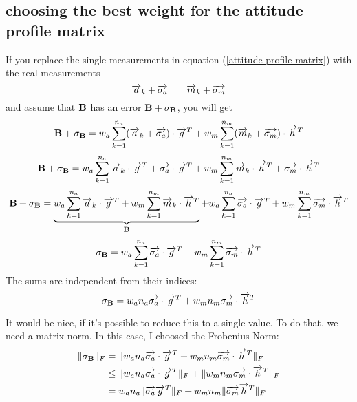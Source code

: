 \subsection{choosing the best weight for the attitude profile matrix}
If you replace the single measurements in equation (\ref{attitude profile matrix}) with the real measurements
\begin{equation}
\overrightarrow{a}_k + \overrightarrow{\sigma_a} \quad \quad \overrightarrow{m}_k + \overrightarrow{\sigma_m}
\end{equation}
and assume that $\mathbf{B}$ has an error $\mathbf{B} +\mathbf{\sigma_B} $, you will get
\begin{equation}
\mathbf{B} +\mathbf{\sigma_B} = w_a \sum_{k=1}^{n_a} (\overrightarrow{a}_k + \overrightarrow{\sigma_a}) \cdot \overrightarrow{g}^{T}  +  w_m \sum_{k=1}^{n_m} (\overrightarrow{m}_k + \overrightarrow{\sigma_m}) \cdot \overrightarrow{h}^{T}
\end{equation}
\begin{equation}
\mathbf{B} +\mathbf{\sigma_B} = w_a \sum_{k=1}^{n_a} \overrightarrow{a}_k \cdot \overrightarrow{g}^{T} + \overrightarrow{\sigma_a} \cdot \overrightarrow{g}^{T} + w_m \sum_{k=1}^{n_m} \overrightarrow{m}_k \cdot \overrightarrow{h}^{T} + \overrightarrow{\sigma_m} \cdot \overrightarrow{h}^{T}
\end{equation}
\begin{equation}
\mathbf{B} +\mathbf{\sigma_B} = \underbrace{w_a \sum_{k=1}^{n_a} \overrightarrow{a}_k \cdot \overrightarrow{g}^{T} + w_m \sum_{k=1}^{n_m} \overrightarrow{m}_k \cdot \overrightarrow{h}^{T}}_{\mathbf{B}} + w_a \sum_{k=1}^{n_a} \overrightarrow{\sigma_a} \cdot \overrightarrow{g}^{T} + w_m \sum_{k=1}^{n_m} \overrightarrow{\sigma_m} \cdot \overrightarrow{h}^{T}
\end{equation}
\begin{equation}
\mathbf{\sigma_B} = w_a \sum_{k=1}^{n_a} \overrightarrow{\sigma_a} \cdot \overrightarrow{g}^{T} + w_m \sum_{k=1}^{n_m} \overrightarrow{\sigma_m} \cdot \overrightarrow{h}^{T}
\end{equation}
The sums are independent from their indices:
\begin{equation}
\mathbf{\sigma_B} = w_a n_a \overrightarrow{\sigma_a} \cdot \overrightarrow{g}^{T} + w_m n_m \overrightarrow{\sigma_m} \cdot \overrightarrow{h}^{T}
\end{equation}

It would be nice, if it's possible to reduce this to a single value. To do that, we need a matrix norm. In this case, I choosed the Frobenius Norm:
\begin{align}
\Vert{\ensuremath{\mathbf{\sigma_B}}}\Vert_{F} &= \Vert{w_a n_a \ensuremath{\overrightarrow{\sigma_a}} \cdot \ensuremath{\overrightarrow{g}^{T}} + w_m n_m \ensuremath{\overrightarrow{\sigma_m}} \cdot \ensuremath{\overrightarrow{h}^{T}}}\Vert_{F}		\\
&\le \Vert{w_a n_a \ensuremath{\overrightarrow{\sigma_a}} \cdot \ensuremath{\overrightarrow{g}^{T}}}\Vert_{F} + \Vert{w_m n_m \ensuremath{\overrightarrow{\sigma_m}} \cdot \ensuremath{\overrightarrow{h}^{T}}}\Vert_{F}		\\
&= w_a n_a \Vert{\ensuremath{\overrightarrow{\sigma_a}} \ensuremath{\overrightarrow{g}^{T}}}\Vert_{F} + w_m n_m \Vert{\ensuremath{\overrightarrow{\sigma_m}} \ensuremath{\overrightarrow{h}^{T}}}\Vert_{F}
\end{align}

